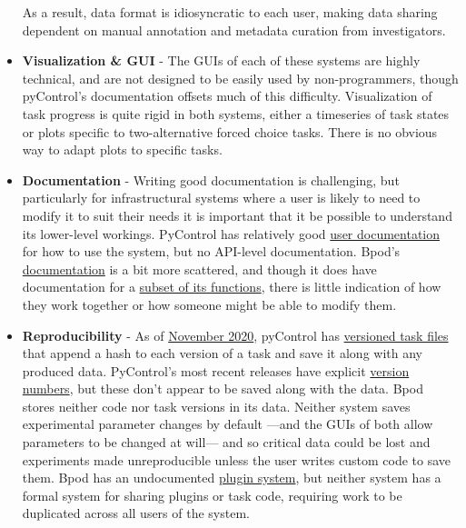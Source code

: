 \begin{itemize}[resume*, before=\vspace{0pt}, after=\vspace{\baselineskip}]
    As a result, data format is idiosyncratic to each user, making data sharing dependent on manual annotation and metadata curation from investigators. 
    \item \textbf{Visualization \& GUI} - The GUIs of each of these systems are highly technical, and are not designed to be easily used by non-programmers, though pyControl's documentation offsets much of this difficulty. Visualization of task progress is quite rigid in both systems, either a timeseries of task states or plots specific to two-alternative forced choice tasks. There is no obvious way to adapt plots to specific tasks.
    \item \textbf{Documentation} - Writing good documentation is challenging, but particularly for infrastructural systems where a user is likely to need to modify it to suit their needs it is important that it be possible to understand its lower-level workings. PyControl has relatively good \href{https://pycontrol.readthedocs.io/en/latest/}{user documentation} for how to use the system, but no API-level documentation. Bpod's \href{https://sites.google.com/site/bpoddocumentation/home}{documentation} is a bit more scattered, and though it does have documentation for a \href{https://sites.google.com/site/bpoddocumentation/user-guide/function-reference}{subset of its functions}, there is little indication of how they work together or how someone might be able to modify them.
    \item \textbf{Reproducibility} - As of \href{https://github.com/pyControl/code/blob/cc6e7ab67c18388dea85b3ac48ac66a65ffa12f8/ChangeLog.txt#L74}{November 2020}, pyControl has \href{https://pycontrol.readthedocs.io/en/latest/user-guide/pycontrol-data/#versioned-task-files}{versioned task files} that append a hash to each version of a task and save it along with any produced data. PyControl's most recent releases have explicit \href{https://github.com/pyControl/code/releases}{version numbers}, but these don't appear to be saved along with the data. Bpod stores neither code nor task versions in its data. Neither system saves experimental parameter changes by default ---and the GUIs of both allow parameters to be changed at will--- and so critical data could be lost and experiments made unreproducible unless the user writes custom code to save them. Bpod has an undocumented \href{https://github.com/sanworks/Bpod_Gen2/commit/10ad997555086afb93dfc1080091acaa58d740f9}{plugin system}, but neither system has a formal system for sharing plugins or task code, requiring work to be duplicated across all users of the system.

\end{itemize}
